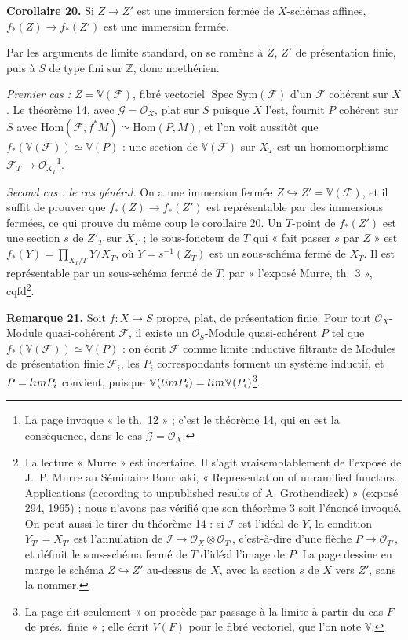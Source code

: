 \documentclass[11pt,a4paper]{article}
\begin{document}
\textbf{Corollaire 20.} Si $Z \to Z'$ est une immersion fermée de $X$-schémas
affines, $f_{*}(Z) \to f_{*}(Z')$ est une immersion fermée.

Par les arguments de limite standard, on se ramène à $Z$, $Z'$ de présentation
finie, puis à $S$ de type fini sur $\mathbb{Z}$, donc noethérien.

\emph{Premier cas : $Z = \mathbb{V}(\mathcal{F})$}, fibré vectoriel
$\operatorname{Spec} \mathrm{Sym}(\mathcal{F})$ d'un $\mathcal{F}$ cohérent sur
$X$. Le théorème 14, avec $\mathcal{G} = \mathcal{O}_X$, plat sur $S$
puisque $X$ l'est, fournit $P$ cohérent sur $S$ avec
$\mathrm{Hom}(\mathcal{F}, f^{*}M) \simeq \mathrm{Hom}(P, M)$, et l'on voit
aussitôt que $f_{*}(\mathbb{V}(\mathcal{F})) \simeq \mathbb{V}(P)$ : une
section de $\mathbb{V}(\mathcal{F})$ sur $X_T$ est un homomorphisme
$\mathcal{F}_T \to \mathcal{O}_{X_T}$\footnote{La page invoque « le th.~12 » ;
c'est le théorème 14, qui en est la conséquence, dans le cas
$\mathcal{G} = \mathcal{O}_X$.}.

\emph{Second cas : le cas général.} On a une immersion fermée
$Z \hookrightarrow Z' = \mathbb{V}(\mathcal{F})$, et il suffit de prouver que
$f_{*}(Z) \to f_{*}(Z')$ est représentable par des immersions fermées,
ce qui prouve du même coup le corollaire 20. Un $T$-point de $f_{*}(Z')$ est
une section $s$ de $Z'_T$ sur $X_T$ ; le sous-foncteur de $T$ qui « fait passer
$s$ par $Z$ » est $f_{*}(Y) = \prod_{X_T/T} Y/X_T$, où $Y = s^{-1}(Z_T)$ est un
sous-schéma fermé de $X_T$. Il est représentable par un sous-schéma fermé de
$T$, par « l'exposé Murre, th.~3 », cqfd\footnote{La lecture « Murre » est
incertaine. Il s'agit vraisemblablement de l'exposé de J.~P. Murre au
Séminaire Bourbaki, « Representation of unramified functors. Applications
(according to unpublished results of A. Grothendieck) » (exposé 294, 1965) ;
nous n'avons pas vérifié que son théorème 3 soit l'énoncé invoqué. On peut
aussi le tirer du théorème 14 : si $\mathcal{I}$ est l'idéal de $Y$, la
condition $Y_{T'} = X_{T'}$ est l'annulation de $\mathcal{I} \to
\mathcal{O}_{X} \otimes \mathcal{O}_{T'}$, c'est-à-dire d'une flèche
$P \to \mathcal{O}_{T'}$, et définit le sous-schéma fermé de $T$ d'idéal
l'image de $P$. La page dessine en marge le schéma $Z \hookrightarrow Z'$
au-dessus de $X$, avec la section $s$ de $X$ vers $Z'$, sans la nommer.}.

\textbf{Remarque 21.} Soit $f \colon X \to S$ propre, plat, de présentation
finie. Pour tout $\mathcal{O}_X$-Module quasi-cohérent $\mathcal{F}$, il existe
un $\mathcal{O}_S$-Module quasi-cohérent $P$ tel que
$f_{*}(\mathbb{V}(\mathcal{F})) \simeq \mathbb{V}(P)$ : on écrit $\mathcal{F}$
comme limite inductive filtrante de Modules de présentation finie
$\mathcal{F}_i$, les $P_i$ correspondants forment un système inductif, et
$P = \varinjlim P_i$ convient, puisque $\mathbb{V}(\varinjlim P_i) =
\varprojlim \mathbb{V}(P_i)$\footnote{La page dit seulement « on procède par
passage à la limite à partir du cas $F$ de prés.\ finie » ; elle écrit
$V(F)$ pour le fibré vectoriel, que l'on note $\mathbb{V}$.}.
\end{document}

